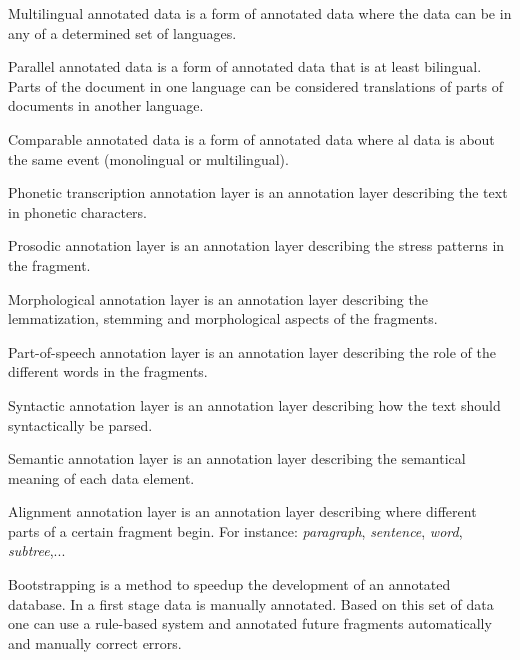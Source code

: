 \documentclass{article}
\begin{document}
\begin{df}{Multilingual annotated data}\sb{} is a form of annotated data where the data can be in any of a determined set of languages.
\end{df}
\begin{df}{Parallel annotated data}\sb{} is a form of annotated data that is at least bilingual. Parts of the document in one language can be considered translations of parts of documents in another language.
\end{df}
\begin{df}{Comparable annotated data}\sb{} is a form of annotated data where al data is about the same event (monolingual or multilingual).
\end{df}
\begin{df}{Phonetic transcription annotation layer}\sb{} is an annotation layer describing the text in phonetic characters.
\end{df}
\begin{df}{Prosodic annotation layer}\sb{} is an annotation layer describing the stress patterns in the fragment.
\end{df}
\begin{df}{Morphological annotation layer}\sb{} is an annotation layer describing the lemmatization, stemming and morphological aspects of the fragments.
\end{df}
\begin{df}{Part-of-speech annotation layer}\sb{} is an annotation layer describing the role of the different words in the fragments.
\end{df}
\begin{df}{Syntactic annotation layer}\sb{} is an annotation layer describing how the text should syntactically be parsed.
\end{df}
\begin{df}{Semantic annotation layer}\sb{} is an annotation layer describing the semantical meaning of each data element.
\end{df}
\begin{df}{Alignment annotation layer}\sb{} is an annotation layer describing where different parts of a certain fragment begin. For instance: \emph{paragraph}, \emph{sentence}, \emph{word}, \emph{subtree},...
\end{df}
\begin{df}{Bootstrapping}\sb{} is a method to speedup the development of an annotated database. In a first stage data is manually annotated. Based on this set of data one can use a rule-based system and annotated future fragments automatically and manually correct errors.
\end{df}
\end{document}
